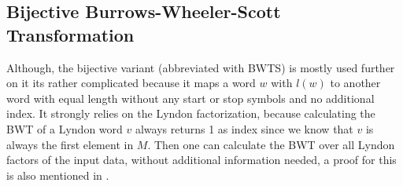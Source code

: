 \subsection{Bijective Burrows-Wheeler-Scott Transformation}
\label{ch:Principles of compression:sec:Other:subSec:bwtscott}
\par{
Although, the bijective variant (abbreviated with BWTS) is mostly used further on it its rather complicated because it maps a word $w$ with $l(w)$ to another word with equal length without any start or stop symbols and no additional index. It strongly relies on the Lyndon factorization, because calculating the BWT of a Lyndon word $v$ always returns 1 as index since we know that $v$ is always the first element in $M$. Then one can calculate the BWT over all Lyndon factors of the input data, without additional information needed, a proof for this is also mentioned in \cite{kufleitner2009bijective}.
}

